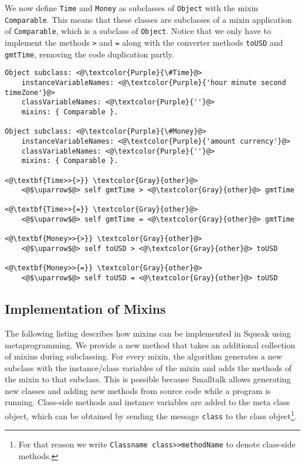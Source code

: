 \documentclass[12pt]{article}
\begin{document}
We now define \texttt{Time} and \texttt{Money} as subclasses of \texttt{Object} with the mixin \texttt{Comparable}. This means that these classes are subclasses of a mixin application of \texttt{Comparable}, which is a subclass of \texttt{Object}. Notice that we only have to implement the methods \texttt{>} and \texttt{=} along with the converter methods \texttt{toUSD} and \texttt{gmtTime}, removing the code duplication partly.
\begin{lstlisting}
Object subclass: <@\textcolor{Purple}{\#Time}@>
    instanceVariableNames: <@\textcolor{Purple}{'hour minute second timeZone'}@>
    classVariableNames: <@\textcolor{Purple}{''}@>
    mixins: { Comparable }.
    
Object subclass: <@\textcolor{Purple}{\#Money}@>
    instanceVariableNames: <@\textcolor{Purple}{'amount currency'}@>
    classVariableNames: <@\textcolor{Purple}{''}@>
    mixins: { Comparable }.
    
<@\textbf{Time>>{>}} \textcolor{Gray}{other}@>
    <@$\uparrow$@> self gmtTime > <@\textcolor{Gray}{other}@> gmtTime

<@\textbf{Time>>{=}} \textcolor{Gray}{other}@>
    <@$\uparrow$@> self gmtTime = <@\textcolor{Gray}{other}@> gmtTime
    
<@\textbf{Money>>{>}} \textcolor{Gray}{other}@>
    <@$\uparrow$@> self toUSD > <@\textcolor{Gray}{other}@> toUSD
    
<@\textbf{Money>>{=}} \textcolor{Gray}{other}@>
    <@$\uparrow$@> self toUSD = <@\textcolor{Gray}{other}@> toUSD
\end{lstlisting}

\subsection{Implementation of Mixins}
The following listing describes how mixins can be implemented in Squeak using metaprogramming. We provide a new method that takes an additional collection of mixins during subclassing. For every mixin, the algorithm generates a new subclass with the instance/class variables of the mixin and adds the methods of the mixin to that subclass. This is possible because Smalltalk allows generating new classes and adding new methods from source code while a program is running. Class-side methods and instance variables are added to the meta class object, which can be obtained by sending the message \texttt{class} to the class object\footnote{For that reason we write \texttt{Classname class>>methodName} to denote class-side methods.}.
\end{document}
